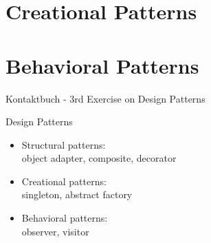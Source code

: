 \section{Creational Patterns}


\section{Behavioral Patterns}


\begin{frame}
	\begin{fancycolumns}[widths={65}]
		\begin{example}{Kontaktbuch - 3rd Exercise on Design Patterns}
			\begin{itemize}
				\userstoriesA
				\userstoriesB
				\userstoriesC
			\end{itemize}
		\end{example}
		\nextcolumn
		\begin{definition}{Design Patterns}
			\begin{itemize}
				\item Structural patterns:\\object adapter, composite, decorator
				\item Creational patterns:\\singleton, abstract factory
				\item Behavioral patterns:\\observer, visitor
			\end{itemize}
		\end{definition}
	\end{fancycolumns}
\end{frame}

